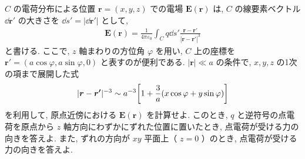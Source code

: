 \documentclass[../../ou-physics-exam.tex]{subfiles}
\begin{document}
$ C $ の電荷分布による位置 $ \bm{r} = (x, y, z) $ での電場 $ \bm{E} (\bm{r} ) $ は, $ C $ の線要素ベクトル $ \dd{\bm{r'} } $ の大きさを $ \dd{s'} = | \dd{\bm{r'} } | $ として,
\begin{align*}
    \bm{E} (\bm{r} ) = \frac{1}{4 \pi \varepsilon_0} \int_C q \dd{s'} \frac{\bm{r} - \bm{r'} }{| \bm{r} - \bm{r'} |^3}
\end{align*}
と書ける. 
ここで, $ z $ 軸まわりの方位角 $ \varphi $ を用い, $ C $ 上の座標を $ \bm{r'} = (a \cos \varphi , a \sin \varphi , 0) $ と表すのが便利である. 
$ | \bm{r} | \ll a $ の条件で, $ x, y, z $ の1次の項まで展開した式
\begin{align*}
    | \bm{r} - \bm{r'} |^{-3} \sim a^{-3} \qty[ 1 + \frac{3}{a} (x \cos \varphi + y \sin \varphi ) ]
\end{align*}
を利用して, 原点近傍における $ \bm{E} (\bm{r}) $ を計算せよ. 
このとき, $ q $ と逆符号の点電荷を原点から $ z $ 軸方向にわずかにずれた位置に置いたとき, 点電荷が受ける力の向きを答えよ. 
また, ずれの方向が $ xy $ 平面上（ $ z = 0 $ ）のとき, 点電荷が受ける力の向きを答えよ.
\end{document}
